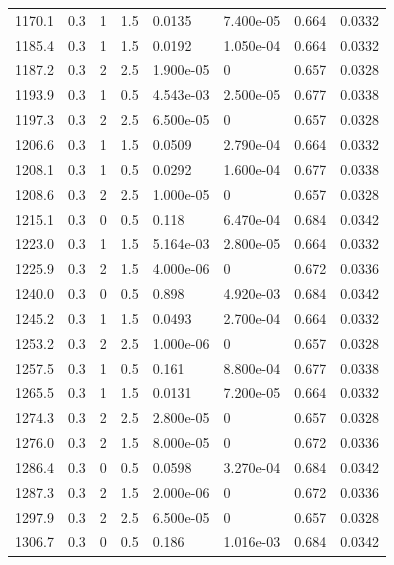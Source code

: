 \documentclass[preview]{standalone}
\begin{document}
{{{{\begin{tabular}{L{1.2cm}C{1.2cm} C{0.3cm}C{0.5cm} C{1.4cm}C{1.4cm} C{1.4cm}C{1.4cm}}
  1170.1  &   0.3  & 1     & 1.5 &  0.0135  & 7.400e-05  & 0.664 &  0.0332   \\ 
  1185.4  &   0.3  & 1     & 1.5 &  0.0192  & 1.050e-04  & 0.664 &  0.0332   \\ 
  1187.2  &   0.3  & 2     & 2.5 &  1.900e-05  & 0  & 0.657 &  0.0328   \\ 
  1193.9  &   0.3  & 1     & 0.5 &  4.543e-03  & 2.500e-05  & 0.677 &  0.0338   \\ 
  1197.3  &   0.3  & 2     & 2.5 &  6.500e-05  & 0  & 0.657 &  0.0328   \\ 
  1206.6  &   0.3  & 1     & 1.5 &  0.0509  & 2.790e-04  & 0.664 &  0.0332   \\ 
  1208.1  &   0.3  & 1     & 0.5 &  0.0292  & 1.600e-04  & 0.677 &  0.0338   \\ 
  1208.6  &   0.3  & 2     & 2.5 &  1.000e-05  & 0  & 0.657 &  0.0328   \\ 
  1215.1  &   0.3  & 0     & 0.5 &  0.118  & 6.470e-04  & 0.684 &  0.0342   \\ 
  1223.0  &   0.3  & 1     & 1.5 &  5.164e-03  & 2.800e-05  & 0.664 &  0.0332   \\ 
  1225.9  &   0.3  & 2     & 1.5 &  4.000e-06  & 0  & 0.672 &  0.0336   \\ 
  1240.0  &   0.3  & 0     & 0.5 &  0.898  & 4.920e-03  & 0.684 &  0.0342   \\ 
  1245.2  &   0.3  & 1     & 1.5 &  0.0493  & 2.700e-04  & 0.664 &  0.0332   \\ 
  1253.2  &   0.3  & 2     & 2.5 &  1.000e-06  & 0  & 0.657 &  0.0328   \\ 
  1257.5  &   0.3  & 1     & 0.5 &  0.161  & 8.800e-04  & 0.677 &  0.0338   \\ 
  1265.5  &   0.3  & 1     & 1.5 &  0.0131  & 7.200e-05  & 0.664 &  0.0332   \\ 
  1274.3  &   0.3  & 2     & 2.5 &  2.800e-05  & 0  & 0.657 &  0.0328   \\ 
  1276.0  &   0.3  & 2     & 1.5 &  8.000e-05  & 0  & 0.672 &  0.0336   \\ 
  1286.4  &   0.3  & 0     & 0.5 &  0.0598  & 3.270e-04  & 0.684 &  0.0342   \\ 
  1287.3  &   0.3  & 2     & 1.5 &  2.000e-06  & 0  & 0.672 &  0.0336   \\ 
  1297.9  &   0.3  & 2     & 2.5 &  6.500e-05  & 0  & 0.657 &  0.0328   \\ 
  1306.7  &   0.3  & 0     & 0.5 &  0.186  & 1.016e-03  & 0.684 &  0.0342   \\ 

\end{tabular}}}}}
\end{document}
